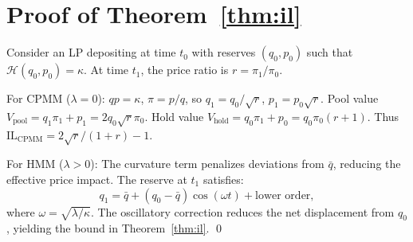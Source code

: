 \section{Proof of Theorem~\ref{thm:il}
}
\label{app:il_proof}

Consider an LP depositing at time $t_0$ with reserves $(q_0, p_0)$ such that $\mathcal{H}(q_0, p_0) = \kappa$. At time $t_1$, the price ratio is $r = \pi_1/\pi_0$.

For CPMM ($\lambda = 0$): $qp = \kappa$, $\pi = p/q$, so $q_1 = q_0/\sqrt{r}$, $p_1 = p_0\sqrt{r}$. Pool value $V_{\text{pool}} = q_1\pi_1 + p_1 = 2q_0\sqrt{r}\pi_0$. Hold value $V_{\text{hold}} = q_0\pi_1 + p_0 = q_0\pi_0(r + 1)$. Thus $\text{IL}_{\text{CPMM}} = 2\sqrt{r}/(1+r) - 1$.

For HMM ($\lambda > 0$): The curvature term penalizes deviations from $\bar{q}$, reducing the effective price impact. The reserve at $t_1$ satisfies:
\begin{equation}
q_1 = \bar{q} + (q_0 - \bar{q}) \cos(\omega t) + \text{lower order},
\end{equation}
where $\omega = \sqrt{\lambda/\kappa}$. The oscillatory correction reduces the net displacement from $q_0$, yielding the bound in Theorem~\ref{thm:il}. \qed

